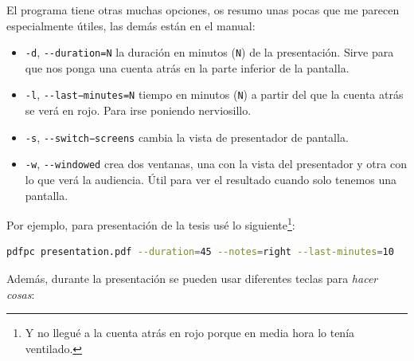 El programa tiene otras muchas opciones, os resumo unas pocas que me
parecen especialmente útiles, las demás están en el manual:

\begin{itemize}
\item
  \lstinline!-d!, \lstinline!--duration=N! la duración en minutos
  (\lstinline!N!) de la presentación. Sirve para que nos ponga una
  cuenta atrás en la parte inferior de la pantalla.
\item
  \lstinline!-l!, \lstinline!--last−minutes=N! tiempo en minutos
  (\lstinline!N!) a partir del que la cuenta atrás se verá en rojo. Para
  irse poniendo nerviosillo.
\item
  \lstinline!-s!, \lstinline!--switch−screens! cambia la vista de
  presentador de pantalla.
\item
  \lstinline!-w!, \lstinline!--windowed! crea dos ventanas, una con la
  vista del presentador y otra con lo que verá la audiencia. Útil para
  ver el resultado cuando solo tenemos una pantalla.
\end{itemize}

Por ejemplo, para presentación de la tesis usé lo siguiente\footnote{Y
  no llegué a la cuenta atrás en rojo porque en media hora lo tenía
  ventilado.}:

\begin{lstlisting}[language=bash]
pdfpc presentation.pdf --duration=45 --notes=right --last-minutes=10
\end{lstlisting}

Además, durante la presentación se pueden usar diferentes teclas para
\emph{hacer cosas}:


